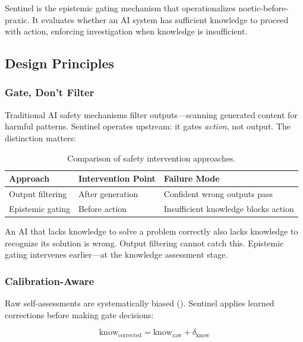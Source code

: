 
Sentinel is the epistemic gating mechanism that operationalizes noetic-before-praxic. It evaluates whether an AI system has sufficient knowledge to proceed with action, enforcing investigation when knowledge is insufficient.

\subsection{Design Principles}

\subsubsection{Gate, Don't Filter}

Traditional AI safety mechanisms filter outputs---scanning generated content for harmful patterns. Sentinel operates upstream: it gates \emph{action}, not output. The distinction matters:

\begin{table}[h]
\centering
\begin{tabular}{lll}
\toprule
\textbf{Approach} & \textbf{Intervention Point} & \textbf{Failure Mode} \\
\midrule
Output filtering & After generation & Confident wrong outputs pass \\
Epistemic gating & Before action & Insufficient knowledge blocks action \\
\bottomrule
\end{tabular}
\caption{Comparison of safety intervention approaches.}
\label{tab:safety-approaches}
\end{table}

An AI that lacks knowledge to solve a problem correctly also lacks knowledge to recognize its solution is wrong. Output filtering cannot catch this. Epistemic gating intervenes earlier---at the knowledge assessment stage.

\subsubsection{Calibration-Aware}

Raw self-assessments are systematically biased (). Sentinel applies learned corrections before making gate decisions:

\begin{equation}
\text{know}_{\text{corrected}} = \text{know}_{\text{raw}} + \delta_{\text{know}}
\end{equation}

